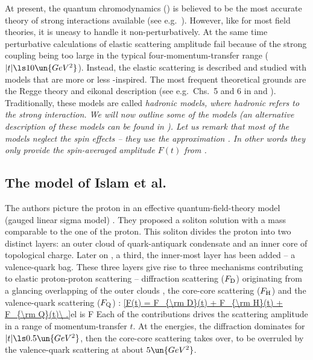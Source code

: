 At present, the quantum chromodynamics () is believed to be the most accurate theory of strong interactions available (see e.g.~). However, like for most field theories, it is uneasy to handle it non-perturbatively. At the same time perturbative calculations of elastic scattering amplitude fail because of the strong coupling being too large in the typical four-momentum-transfer range ($|t| \ls 10\un{GeV^2}$). Instead, the elastic scattering is described and studied with models that are more or less -inspired. The most frequent theoretical grounds are the Regge theory and eikonal description (see e.g.~Chs.~5 and 6 in  and ). Traditionally, these models are called \em{hadronic models}, where hadronic refers to the strong interaction. We will now outline some of the models (an alternative description of these models can be found in ). Let us remark that most of the models neglect the spin effects -- they use the approximation . In other words they only provide the spin-averaged amplitude $F(t)$ from .


\subsection{The model of Islam et al.}

The authors picture the proton in an effective quantum-field-theory model (gauged linear sigma model) . They proposed a soliton solution with a mass comparable to the one of the proton. This soliton divides the proton into two distinct layers: an outer cloud of quark-antiquark condensate and an inner core of topological charge. Later on , a third, the inner-most layer has been added -- a valence-quark bag. These three layers give rise to three mechanisms contributing to elastic proton-proton scattering -- diffraction scattering ($F_{\rm D}$) originating from a glancing overlapping of the outer clouds , the core-core scattering ($F_{\rm H}$)  and the valence-quark scattering ($F_{\rm Q}$) :
\eqref{F(t) = F_{\rm D}(t) + F_{\rm H}(t) + F_{\rm Q}(t)\ .}{el is F}
Each of the contributions drives the scattering amplitude in a range of momentum-transfer $t$. At the  energies, the diffraction dominates for $|t| \ls 0.5\un{GeV^2}$, then the core-core scattering takes over, to be overruled by the valence-quark scattering at about $5\un{GeV^2}$.

